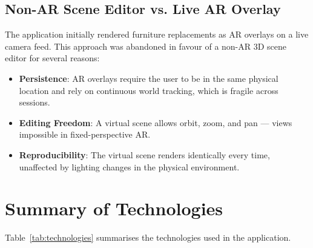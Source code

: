 \subsection{Non-AR Scene Editor vs. Live AR Overlay}

The application initially rendered furniture replacements as AR overlays on a live camera feed. This approach was abandoned in favour of a non-AR 3D scene editor for several reasons:

\begin{itemize}
    \item \textbf{Persistence}: AR overlays require the user to be in the same physical location and rely on continuous world tracking, which is fragile across sessions.
    \item \textbf{Editing Freedom}: A virtual scene allows orbit, zoom, and pan — views impossible in fixed-perspective AR.
    \item \textbf{Reproducibility}: The virtual scene renders identically every time, unaffected by lighting changes in the physical environment.
\end{itemize}


\section{Summary of Technologies}
\label{sec:tech_summary}

Table~\ref{tab:technologies} summarises the technologies used in the application.

